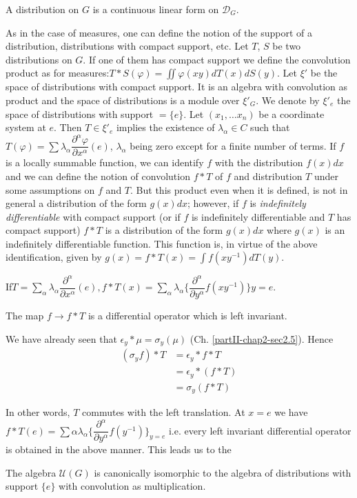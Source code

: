 \begin{defi*}%
 A distribution on $G$ is a continuous linear form on
 $\mathcal{D}_{G}$. 
\end{defi*}  
 
As in the case of measures, one can define the notion of the support
of a distribution, distributions with compact support, etc. Let $T$, $S$
be two distributions on $G$. If one of them has compact support we
define the convolution product as for measures:$T*S(\varphi)  =\iint
\varphi (xy)dT(x)dS(y)$. Let  $\xi'$ be the space of distributions
with compact support. It is an algebra with convolution as product and
the space of distributions is a module over $\xi'_{G}$. We denote by
$\xi'_{e}$ the space of distributions with support
$=\{e\}$. Let $(x_{1},\ldots x_n)$ be a coordinate system at $e$. Then
$T\in \xi'_e$ implies the existence of $\lambda_\alpha\in C$ such that
$T (\varphi)=\sum \lambda_\alpha \dfrac{\partial^{\alpha}\varphi}
{\partial x^{\alpha}} (e)$, $\lambda_{\alpha}$ being zero except for a
finite number of terms. If $f$ is a locally summable function, we can
identify $f$ with  the distribution $f(x)dx$ and we can define the
notion of convolution $f*T$ of $f$ and distribution $T$ under some
assumptions on $f$ and $T$. But this product even when it is defined,
is not in general a distribution of the form $g(x)dx$; however, if $f$
is \textit{indefinitely differentiable} with compact support (or if $f$
is indefinitely differentiable and $T$ has compact support) $f*T$ is a
distribution of the form $g(x)dx$ where $g(x)$ is an indefinitely
differentiable function. This function is, in virtue of the above
identification, given by $g(x)=f*T(x)=\int f(xy^{-1})dT(y)$. 


If\pageoriginale  $T = \sum\limits_{\alpha} \lambda_\alpha
\dfrac{\partial^\alpha}{\partial  x^\alpha}(e),f * T(x) = \sum\limits_{\alpha}
\lambda_\alpha 
\big\{\dfrac{\partial^\alpha}{\partial y^\alpha} f(xy^{-1})\big\} y = e$. 

The map $f \rightarrow f*T$ is a differential operator which is left
invariant. 

We have already seen that $\epsilon_y *\mu = \sigma_y (\mu)$
(Ch. \ref{partII-chap2-sec2.5}). 
Hence
\begin{align*}
(\sigma_y f) * T & = \epsilon_y * f * T\\
& =\epsilon_y * (f * T)\\
& =\sigma_y (f * T)
\end{align*} 

In other words, $T$ commutes with the left translation. At $x=e$ we
have $f*T(e)=\sum\limits{\alpha} \lambda_\alpha
\big\{\dfrac{\partial^\alpha}{\partial y^\alpha} f(y^{-1})\big\}_ {y = e}$
i.e. every left invariant differential operator is obtained in the above
manner. This leads us to the  

\begin{proposition}\label{partII-chap3-prop5}%
 The algebra  $\mathcal{U} (G)$ is canonically isomorphic to the
 algebra of distributions with support $\{e\}$ 
with convolution as multiplication.
\end{proposition}

